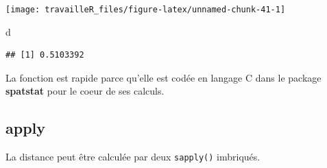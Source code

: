 \documentclass[
  11pt,
  french,
  a4paper,
  extrafontsizes,onecolumn,openright
  ]{memoir}
\newenvironment{Shaded}{\begin{snugshade}}{\end{snugshade}}
\newcommand{\ControlFlowTok}[1]{\textcolor[rgb]{0.13,0.29,0.53}{\textbf{#1}}}
\newcommand{\DecValTok}[1]{\textcolor[rgb]{0.00,0.00,0.81}{#1}}
\newcommand{\FunctionTok}[1]{\textcolor[rgb]{0.00,0.00,0.00}{#1}}
\newcommand{\NormalTok}[1]{#1}
\newcommand{\OtherTok}[1]{\textcolor[rgb]{0.56,0.35,0.01}{#1}}
\newcommand{\SpecialCharTok}[1]{\textcolor[rgb]{0.00,0.00,0.00}{#1}}
\begin{document}
\begin{center}\texttt{[image: travailleR\_files/figure-latex/unnamed-chunk-41-1]} \end{center}

\begin{Shaded}
\begin{Highlighting}[]
\NormalTok{d}
\end{Highlighting}
\end{Shaded}

\begin{verbatim}
## [1] 0.5103392
\end{verbatim}

\normalsize

La fonction est rapide parce qu'elle est codée en langage C dans le package \textbf{spatstat} pour le coeur de ses calculs.

\hypertarget{apply}{%
\subsection{apply}\label{apply}}

La distance peut être calculée par deux \texttt{sapply()} imbriqués.

\scriptsize

\begin{Shaded}
\end{Shaded}
\end{document}
